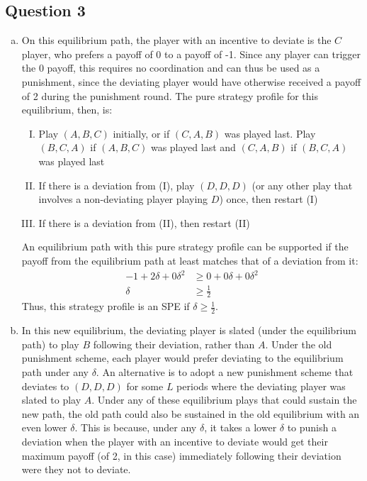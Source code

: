 \documentclass{article}
\begin{document}

\subsection*{Question 3}

\begin{enumerate}[(a)]
	\item On this equilibrium path, the player with an incentive to deviate is the $C$ player, who prefers a payoff of 0 to a payoff of -1. Since any player can trigger the 0 payoff, this requires no coordination and can thus be used as a punishment, since the deviating player would have otherwise received a payoff of 2 during the punishment round. The pure strategy profile for this equilibrium, then, is:
		\begin{enumerate}[(I)]
			\item Play $(A,B,C)$ initially, or if $(C,A,B)$ was played last. Play $(B,C,A)$ if $(A,B,C)$ was played last and $(C,A,B)$ if $(B,C,A)$ was played last
			\item If there is a deviation from (I), play $(D,D,D)$ (or any other play that involves a non-deviating player playing $D$) once, then restart (I)
			\item If there is a deviation from (II), then restart (II)
		\end{enumerate}
		An equilibrium path with this pure strategy profile can be supported if the payoff from the equilibrium path at least matches that of a deviation from it:
		\begin{align*}
			-1 + 2\delta + 0\delta^2  &\geq 0 + 0\delta + 0\delta^2	\\
			\delta &\geq \frac{1}{2}
		\end{align*}
		Thus, this strategy profile is an SPE if ${\delta\geq\frac{1}{2}}$.
	
	\item In this new equilibrium, the deviating player is slated (under the equilibrium path) to play $B$ following their deviation, rather than $A$. Under the old punishment scheme, each player would prefer deviating to the equilibrium path under any $\delta$. An alternative is to adopt a new punishment scheme that deviates to $(D,D,D)$ for some $L$ periods where the deviating player was slated to play $A$. Under any of these equilibrium plays that could sustain the new path, the old path could also be sustained in the old equilibrium with an even lower $\delta$. This is because, under any $\delta$, it takes a lower $\delta$ to punish a deviation when the player with an incentive to deviate would get their maximum payoff (of 2, in this case) immediately following their deviation were they not to deviate.
	
\end{enumerate}
\end{document}
